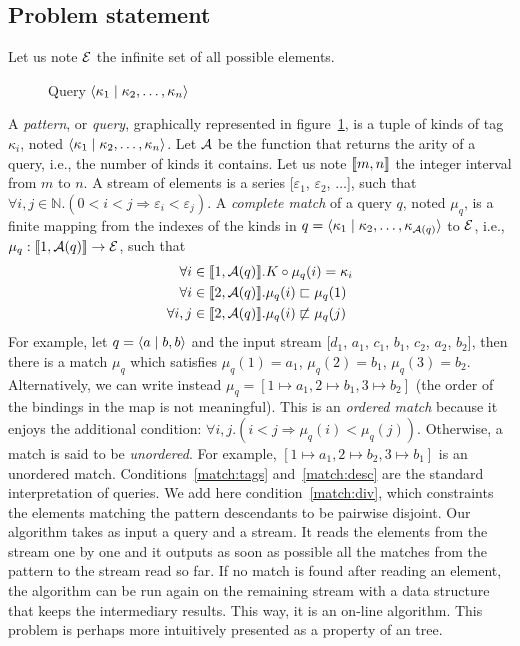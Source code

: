 \subsection{Problem statement}

Let us note \(\cal E\) the infinite set of all possible \XML elements.
\begin{wrapfigure}[7]{r}{0pt}
\caption{Query \(\langle \kappa_1 \mid \kappa_2, \dots, \kappa_n\rangle\)}
\label{pattern}
\end{wrapfigure}
 A \emph{pattern}, or \emph{query}, graphically represented in
 figure~\ref{pattern}, is a tuple of \XML kinds of tag \(\kappa_i\),
 noted \(\langle \kappa_1 \mid \kappa_2, \dots, \kappa_n\rangle\). Let \(\cal A\)
 be the function that returns the arity of a query, i.e., the number
 of kinds it contains. Let us note \(\llbracket{m},{n}\rrbracket\) the integer
 interval from \(m\) to \(n\). A stream of \XML elements is a series
 [\(\varepsilon_1\), \(\varepsilon_2\), \(\dots\)], such that
 \(\forall i,j \in \mathbb{N}.(0 < i < j \Rightarrow \varepsilon_i <
 \varepsilon_j)\). A \emph{complete match} of a query \(q\), noted
 \(\mu_q\), is a finite mapping from the indexes of the kinds in \(q =
 \langle \kappa_1 \mid \kappa_2, \dots, \kappa_{{\cal A}(q)}\rangle\) to \(\cal
 E\), i.e., \(\mu_q: \llbracket{1},{{\cal A}(q)}\rrbracket \rightarrow {\cal E}\),
 such that
\begin{align}
\forall i \in \llbracket{1},{{\cal A}(q)}\rrbracket.& K \circ \mu_q(i) = \kappa_i
\label{match:tags}\\
\forall i \in \llbracket{2},{{\cal A}(q)}\rrbracket.& \mu_q(i) \sqsubset \mu_q(1)
\label{match:desc}\\
\forall i,j \in \llbracket{2},{{\cal A}(q)}\rrbracket.& \mu_q(i) \not\sqsubset \mu_q(j)
\label{match:div}
\end{align}
For example, let \(q = \langle a \mid b,b\rangle\) and the input stream [\(d_1\),
 \(a_1\), \(c_1\), \(b_1\), \(c_2\), \(a_2\), \(b_2\)], then there is
 a match \(\mu_q\) which satisfies \(\mu_q(1) = a_1\), \(\mu_q(2) =
 b_1\), \(\mu_q(3) = b_2\). Alternatively, we can write instead
 \(\mu_q = [1 \mapsto a_1, 2 \mapsto b_1, 3 \mapsto b_2]\) (the order
 of the bindings in the map is not meaningful). This is an
 \emph{ordered match} because it enjoys the additional condition:
 \(\forall i,j.(i < j \Rightarrow \mu_q(i) < \mu_q(j))\). Otherwise, a
 match is said to be \emph{unordered}. For example, \([1 \mapsto a_1,
 2 \mapsto b_2, 3 \mapsto b_1]\) is an unordered
 match. Conditions~\eqref{match:tags} and~\eqref{match:desc} are the
 standard interpretation of \XPath queries. We add here
 condition~\eqref{match:div}, which constraints the elements matching
 the pattern descendants to be pairwise disjoint. Our algorithm
 takes as input a query and a stream. It reads the elements from the
 stream one by one and it outputs as soon as possible all the matches
 from the pattern to the stream read so far. If no match is found
 after reading an element, the algorithm can be run again on the
 remaining stream with a data structure that keeps the intermediary
 results. This way, it is an on\hyp{}line algorithm. This problem is
 perhaps more intuitively presented as a property of an \XML tree.


